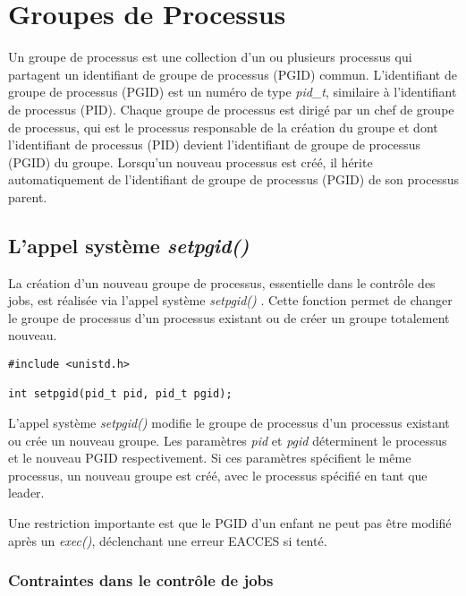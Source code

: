 \section{Groupes de Processus}
Un groupe de processus est une collection d’un ou plusieurs processus qui partagent un identifiant de groupe de processus (PGID) commun. L'identifiant de groupe de processus (PGID) est un numéro de type \textit{pid\_t}, similaire à l'identifiant de processus (PID). 
\newline
Chaque groupe de processus est dirigé par un chef de groupe de processus, qui est le processus responsable de la création du groupe et dont l'identifiant de processus (PID) devient l'identifiant de groupe de processus (PGID) du groupe. Lorsqu'un nouveau processus est créé, il hérite automatiquement de l'identifiant de groupe de processus (PGID) de son processus parent.
\newline

\subsection{L’appel système \textit{setpgid()}}

La création d'un nouveau groupe de processus, essentielle dans le contrôle des jobs, est réalisée via l'appel système \textit{setpgid()} . Cette fonction permet de changer le groupe de processus d'un processus existant ou de créer un groupe totalement nouveau.

\begin{lstlisting}[frame=single]
#include <unistd.h>

int setpgid(pid_t pid, pid_t pgid);
\end{lstlisting}

L’appel système \textit{setpgid()} modifie le groupe de processus d'un processus existant ou crée un nouveau groupe. Les paramètres \textit{pid} et \textit{pgid} déterminent le processus et le nouveau PGID respectivement. Si ces paramètres spécifient le même processus, un nouveau groupe est créé, avec le processus spécifié en tant que leader.

Une restriction importante est que le PGID d'un enfant ne peut pas être modifié après un \textit{exec()}, déclenchant une erreur EACCES si tenté.

\subsubsection{Contraintes dans le contrôle de jobs}

